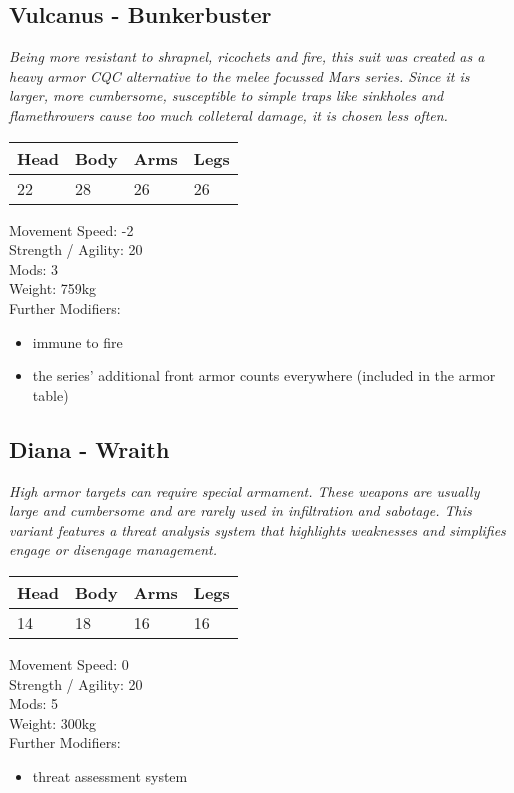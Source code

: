 \documentclass[12pt,a4paper,openany]{book}
\begin{document}
\begin{multicols}{2}
	\subsection{Vulcanus - Bunkerbuster}
	\textit{Being more resistant to shrapnel, ricochets and fire, this suit was created as a heavy armor CQC alternative to the melee focussed Mars series. Since it is larger, more cumbersome, susceptible to simple traps like sinkholes and flamethrowers cause too much colleteral damage, it is chosen less often.}\par
	\begin{tabular}{|l|l|l|l|}
		\hline
		Head & Body & Arms & Legs\\
		\hline
		22 & 28 & 26 & 26\\
		\hline
	\end{tabular}
	\par
	Movement Speed: -2\\
	Strength / Agility: 20\\
	Mods: 3\\
	Weight: 759kg\\
	Further Modifiers:
	\vspace{-8mm}
	\begin{itemize}
		\setlength\itemsep{-8mm}
		\item immune to fire
		\item the series' additional front armor counts everywhere (included in the armor table)
	\end{itemize}
	\par
	\subsection{Diana - Wraith}
	\textit{High armor targets can require special armament. These weapons are usually large and cumbersome and are rarely used in infiltration and sabotage. This variant features a threat analysis system that highlights weaknesses and simplifies engage or disengage management.}\par
	\begin{tabular}{|l|l|l|l|}
		\hline
		Head & Body & Arms & Legs\\
		\hline
		14 & 18 & 16 & 16\\
		\hline
	\end{tabular}
	\par
	Movement Speed: 0\\
	Strength / Agility: 20\\
	Mods: 5\\
	Weight: 300kg\\
	Further Modifiers:
	\vspace{-8mm}
	\begin{itemize}
		\setlength\itemsep{-8mm}
		\item threat assessment system
	\end{itemize}
	\par

\end{multicols}
\end{document}
